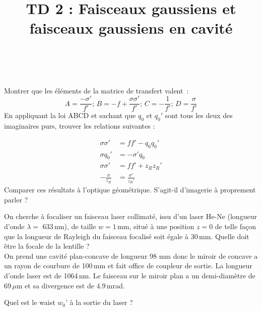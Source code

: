 \documentclass[12pt]{article}
\title{TD 2 : Faisceaux gaussiens et faisceaux gaussiens en cavité}
\newenvironment{exercice}[2][Exercice]{\begin{trivlist}
\item[\hskip \labelsep {\bfseries #1}\hskip \labelsep {\bfseries #2.}]}{\end{trivlist}}
\begin{document}
 

 
\maketitle
 
\begin{exercice}{1}
\\\\
Montrer que les éléments de la matrice de transfert valent~:
\begin{equation}
    A=\frac{-\sigma'}{f'};\,B=-f+\frac{\sigma \sigma'}{f'};\,C=-\frac{1}{f'};\,D=\frac{\sigma}{f'}
\end{equation}
En appliquant la loi ABCD et sachant que $q_0$ et $q_0'$ sont tous les deux des imaginaires purs, trouver les relations suivantes :

\begin{align}
    \sigma \sigma'&=ff'-q_0q_0'\\
    \sigma q_0' &= -\sigma'q_0\\
    \sigma \sigma' &= ff' + z_Rz_R'\\
    -\frac{\sigma}{z_R}&=\frac{\sigma'}{z_R'}
\end{align}
Comparer ces résultats à l'optique géométrique. S'agit-il d'imagerie à proprement parler ?
\end{exercice}
 
 


\begin{exercice}{2}
On cherche à focaliser un faisceau laser collimaté, issu d'un laser He-Ne (longueur d'onde $\lambda=$ 633$\,$nm), de taille $w= 1\,$mm, situé à une position $z=0$ de telle façon que la longueur de Rayleigh du faisceau focalisé soit égale à 30$\,$mm.
Quelle doit être la focale de la lentille ?
\\
On prend une cavité plan-concave de longueur 98 mm donc le miroir de concave a un rayon de courbure de 100$\,$mm et fait office de coupleur de sortie. La longueur d’onde laser est de 1064$\,$nm. Le faisceau sur le miroir plan a un demi-diamètre de 69$\,\mu$m et sa divergence est de $4.9\,$mrad.

Quel est le waist $w_0’$ à la sortie du laser ?
\end{exercice}
\\
\end{document}
